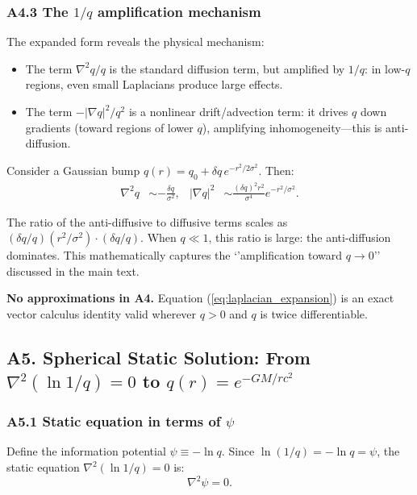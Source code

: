 \documentclass[reprint]{revtex4-2}
\begin{document}
\subsubsection{A4.3 The $1/q$ amplification mechanism}

The expanded form reveals the physical mechanism:
\begin{itemize}
\item The term $\nabla^2 q/q$ is the standard diffusion term, but amplified by $1/q$: in low-$q$ regions, even small Laplacians produce large effects.
\item The term $-|\nabla q|^2/q^2$ is a nonlinear drift/advection term: it drives $q$ down gradients (toward regions of lower $q$), amplifying inhomogeneity---this is anti-diffusion.
\end{itemize}

Consider a Gaussian bump $q(r) = q_0 + \delta q\,e^{-r^2/2\sigma^2}$. Then:
\begin{align}
\nabla^2 q &\sim -\frac{\delta q}{\sigma^2}, &
|\nabla q|^2 &\sim \frac{(\delta q)^2 r^2}{\sigma^4}e^{-r^2/\sigma^2}.
\end{align}

The ratio of the anti-diffusive to diffusive terms scales as $(\delta q/q)(r^2/\sigma^2)\cdot(\delta q/q)$. When $q\ll 1$, this ratio is large: the anti-diffusion dominates. This mathematically captures the `'amplification toward $q\to 0$'' discussed in the main text.

\textbf{No approximations in A4.} Equation (\ref{eq:laplacian_expansion}) is an exact vector calculus identity valid wherever $q>0$ and $q$ is twice differentiable.

\subsection{A5. Spherical Static Solution: From $\nabla^2(\ln 1/q)=0$ to $q(r)=e^{-GM/rc^2}$}

\subsubsection{A5.1 Static equation in terms of $\psi$}

Define the information potential $\psi \equiv -\ln q$. Since $\ln(1/q) = -\ln q = \psi$, the static equation $\nabla^2(\ln 1/q)=0$ is:
\begin{equation}
\nabla^2\psi = 0.
\label{eq:static_psi}
\end{equation}
\end{document}
